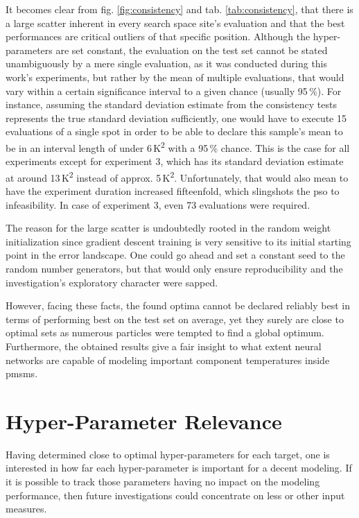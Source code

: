 It becomes clear from fig. \ref{fig:consistency} and tab. \ref{tab:consistency}, that there is a large scatter inherent in every search space site's evaluation and that the best performances are critical outliers of that specific position.
Although the hyper-parameters are set constant, the evaluation on the test set cannot be stated unambiguously by a mere single evaluation, as it was conducted during this work's experiments, but rather by the mean of multiple evaluations, that would vary within a certain significance interval to a given chance (usually 95\,\%).
For instance, assuming the standard deviation estimate from the consistency tests represents the true standard deviation sufficiently, one would have to execute 15 evaluations of a single spot in order to be able to declare this sample's mean to be in an interval length of under 6\,K\textsuperscript{2} with a 95\,\% chance.
This is the case for all experiments except for experiment 3, which has its standard deviation estimate at around 13\,K\textsuperscript{2} instead of approx. 5\,K\textsuperscript{2}.
Unfortunately, that would also mean to have the experiment duration increased fifteenfold, which slingshots the \gls{pso} to infeasibility.
In case of experiment 3, even 73 evaluations were required.

The reason for the large scatter is undoubtedly rooted in the random weight initialization since gradient descent training is very sensitive to its initial starting point in the error landscape.
One could go ahead and set a constant seed to the random number generators, but that would only ensure reproducibility and the investigation's exploratory character were sapped.

However, facing these facts, the found optima cannot be declared reliably best in terms of performing best on the test set on average, yet they surely are close to optimal sets as numerous particles were tempted to find a global optimum.
Furthermore, the obtained results give a fair insight to what extent neural networks are capable of modeling important component temperatures inside \glspl{pmsm}.

\section{Hyper-Parameter Relevance}
\label{sec:relevance}
Having determined close to optimal hyper-parameters for each target, one is interested in how far each hyper-parameter is important for a decent modeling.
If it is possible to track those parameters having no impact on the modeling performance, then future investigations could concentrate on less or other input measures.

